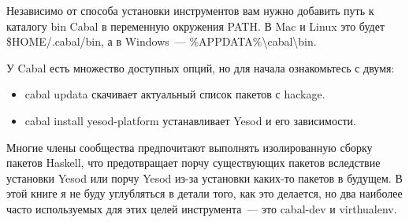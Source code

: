 Независимо от способа установки инструментов вам нужно добавить путь к каталогу bin Cabal в переменную окружения PATH. В Mac и Linux это будет \$HOME/.cabal/bin, а в Windows~--- \%APPDATA\%\textbackslash{}cabal\textbackslash{}bin.

У Cabal есть множество доступных опций, но для начала ознакомьтесь с двумя:

\begin{itemize}
  \item cabal updata скачивает актуальный список пакетов с hackage.
  \item cabal install yesod-platform устанавливает Yesod и его зависимости.
\end{itemize}

Многие члены сообщества предпочитают выполнять изолированную сборку пакетов Haskell, что предотвращает порчу существующих пакетов вследствие установки Yesod или порчу Yesod из-за установки каких-то пакетов в будущем. В этой книге я не буду углубляться в детали того, как это делается, но два наиболее часто используемых для этих целей инструмента~--- это cabal-dev и virthualenv.
